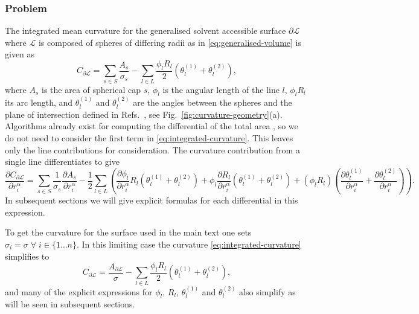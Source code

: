 \subsubsection{Problem}

The integrated mean curvature for the generalised solvent accessible surface $\partial\mathcal{L}$ where $\mathcal{L}$ is composed of spheres of differing radii as in \eqref{eq:generalised-volume} is given as \cite{Roth2006}
\begin{equation}\label{eq:integrated-curvature}
  C_{\partial\mathcal{L}} =
  \sum_{s \in S} \frac{A_s}{\sigma_s} -
  \sum_{l \in L} \frac{\phi_l R_l}{2} (\theta_l^{(1)} + \theta_l^{(2)}),
\end{equation}
where $A_s$ is the area of spherical cap $s$, $\phi_l$ is the angular length of the line $l$, $\phi_l R_l$ its arc length, and $\theta_l^{(1)}$ and $\theta_l^{(2)}$ are the angles between the spheres and the plane of intersection defined in Refs.\ \cite{Connolly1983,Connolly1985}, see Fig.\ \ref{fig:curvature-geometry}(a).
Algorithms already exist for computing the differential of the total area \cite{Bryant2004,Klenin2011}, so we do not need to consider the first term in \eqref{eq:integrated-curvature}.
This leaves only the line contributions for consideration.
The curvature contribution from a single line differentiates to give
\begin{equation}\label{eq:line-curvature-differential}
  \frac{\partial C_{\partial\mathcal{L}}}{\partial r_i^\alpha} =
  \sum_{s \in S} \frac{1}{\sigma_s}
  \frac{\partial A_s}{\partial r_i^\alpha} -
  \frac{1}{2} \sum_{l \in L} \left(
  \frac{\partial \phi_l}{\partial r_i^\alpha} R_l (\theta_l^{(1)} + \theta_l^{(2)}) +
  \phi_l \frac{\partial R_l}{\partial r_i^\alpha} (\theta_l^{(1)} + \theta_l^{(2)}) +
  (\phi_l R_l) \left(
  \frac{\partial \theta_l^{(1)}}{\partial r_i^\alpha} +
  \frac{\partial \theta_l^{(2)}}{\partial r_i^\alpha}
  \right)
  \right).
\end{equation}
In subsequent sections we will give explicit formulas for each differential in this expression.


To get the curvature for the surface used in the main text one sets $\sigma_i = \sigma \; \forall \; i \in \{1 \dots n\}$.
In this limiting case the curvature \eqref{eq:integrated-curvature} simplifies to
\begin{equation*}
  C_{\partial\mathcal{L}} =
  \frac{A_{\partial\mathcal{L}}}{\sigma} -
  \sum_{l \in L} \frac{\phi_l R_l}{2} (\theta_l^{(1)} + \theta_l^{(2)}),
\end{equation*}
and many of the explicit expressions for $\phi_l$, $R_l$, $\theta_l^{(1)}$ and $\theta_l^{(2)}$ also simplify as will be seen in subsequent sections.

